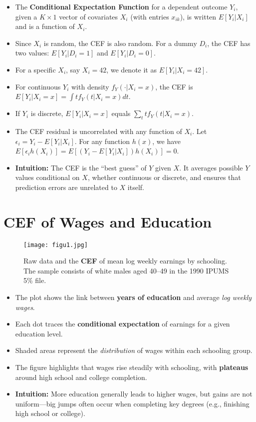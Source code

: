 \documentclass[12pt]{article}
\begin{document}
\begin{itemize}
    \item The \textbf{Conditional Expectation Function} for a dependent outcome $Y_i$, given a $K \times 1$ vector of covariates $X_i$ (with entries $x_{ik}$), is written $E[Y_i|X_i]$ and is a function of $X_i$.
    \item Since $X_i$ is random, the CEF is also random. For a dummy $D_i$, the CEF has two values: $E[Y_i|D_i=1]$ and $E[Y_i|D_i=0]$.
    \item For a specific $X_i$, say $X_i = 42$, we denote it as $E[Y_i|X_i=42]$.
    \item For continuous $Y_i$ with density $f_Y(\cdot|X_i=x)$, the CEF is $E[Y_i|X_i=x] = \int t f_Y(t|X_i=x) dt$.
    \item If $Y_i$ is discrete, $E[Y_i|X_i=x]$ equals $\sum_t t f_Y(t|X_i=x)$.
    \item The CEF residual is uncorrelated with any function of $X_i$. Let $\epsilon_i = Y_i - E[Y_i|X_i]$. For any function $h(x)$, we have $E[\epsilon_i h(X_i)] = E[(Y_i - E[Y_i|X_i])h(X_i)] = 0$.
    \item \textbf{Intuition:} The CEF is the “best guess” of $Y$ given $X$. It averages possible $Y$ values conditional on $X$, whether continuous or discrete, and ensures that prediction errors are unrelated to $X$ itself.
\end{itemize}

\section*{\noindent\textbf{CEF of Wages and Education}}

\begin{figure}[H]
    \centering
    \texttt{[image: figu1.jpg]} 
    \caption*{Raw data and the \textbf{CEF} of mean log weekly earnings by schooling. 
    The sample consists of white males aged 40--49 in the 1990 IPUMS 5\% file.}
\end{figure}

\begin{itemize}
    \item The plot shows the link between \textbf{years of education} and average \textit{log weekly wages}.
    \item Each dot traces the \textbf{conditional expectation} of earnings for a given education level.
    \item Shaded areas represent the \textit{distribution} of wages within each schooling group.
    \item The figure highlights that wages rise steadily with schooling, with \textbf{plateaus} around high school and college completion.
    \item \textbf{Intuition:} More education generally leads to higher wages, but gains are not uniform—big jumps often occur when completing key degrees (e.g., finishing high school or college).
\end{itemize}
\end{document}
